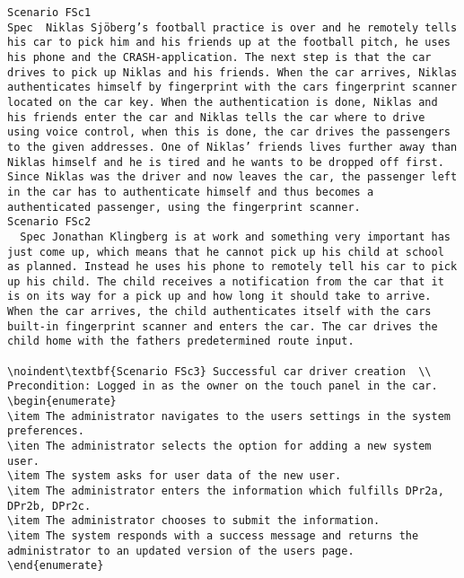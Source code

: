 \begin{lstlisting}
Scenario FSc1
Spec  Niklas Sjöberg’s football practice is over and he remotely tells his car to pick him and his friends up at the football pitch, he uses his phone and the CRASH-application. The next step is that the car drives to pick up Niklas and his friends. When the car arrives, Niklas authenticates himself by fingerprint with the cars fingerprint scanner located on the car key. When the authentication is done, Niklas and his friends enter the car and Niklas tells the car where to drive using voice control, when this is done, the car drives the passengers to the given addresses. One of Niklas’ friends lives further away than Niklas himself and he is tired and he wants to be dropped off first. Since Niklas was the driver and now leaves the car, the passenger left in the car has to authenticate himself and thus becomes a authenticated passenger, using the fingerprint scanner.
Scenario FSc2
  Spec Jonathan Klingberg is at work and something very important has just come up, which means that he cannot pick up his child at school as planned. Instead he uses his phone to remotely tell his car to pick up his child. The child receives a notification from the car that it is on its way for a pick up and how long it should take to arrive. When the car arrives, the child authenticates itself with the cars built-in fingerprint scanner and enters the car. The car drives the child home with the fathers predetermined route input.
  
\noindent\textbf{Scenario FSc3} Successful car driver creation  \\
Precondition: Logged in as the owner on the touch panel in the car.
\begin{enumerate}
\item The administrator navigates to the users settings in the system preferences.
\iten The administrator selects the option for adding a new system user.
\item The system asks for user data of the new user.
\item The administrator enters the information which fulfills DPr2a, DPr2b, DPr2c.
\item The administrator chooses to submit the information.
\item The system responds with a success message and returns the administrator to an updated version of the users page.
\end{enumerate}

\end{lstlisting}
    
